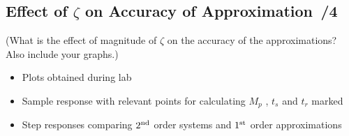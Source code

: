 \documentclass{article}
\newcommand{\score}{\hfill \underline{\hspace{0.65cm}}\,/} %
\begin{document}
\subsection*{Effect of $\zeta$ on Accuracy of Approximation \score 4}
(What is the effect of magnitude of $\zeta$ on the accuracy of the approximations? Also include your graphs.)
\newline \\[10mm]
\begin{itemize}
\item Plots obtained during lab
\item Sample response with relevant points for calculating $M_p$ , $t_s$ and $t_r$ marked
\item Step responses comparing $2^{\rm nd}$ order systems and $1^{\rm st}$ order approximations
\end{itemize}
\end{document}
